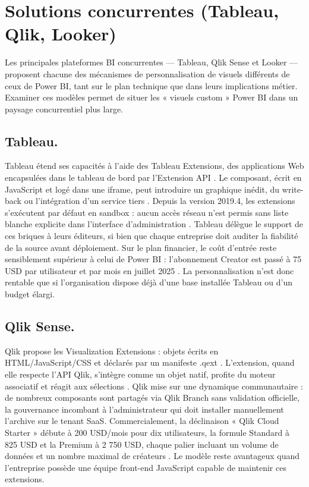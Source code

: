 \section{Solutions concurrentes (Tableau, Qlik, Looker)}
\label{sec:concurrence}

Les principales plateformes BI concurrentes — Tableau, Qlik Sense et
Looker — proposent chacune des mécanismes de personnalisation de visuels
différents de ceux de Power BI, tant sur le plan technique que dans leurs
implications métier. Examiner ces modèles permet de situer les « visuels
custom » Power BI dans un paysage concurrentiel plus large.

\subsection{Tableau.}  
Tableau étend ses capacités à l’aide des Tableau Extensions, des
applications Web encapsulées dans le tableau de bord par l’Extension API
\parencite{TableauExtGuide2024}. Le composant, écrit en JavaScript et
logé dans une iframe, peut introduire un graphique inédit, du
write-back ou l’intégration d’un service tiers
\parencite{TableauBlogExt2024}. Depuis la version 2019.4, les extensions
s’exécutent par défaut en sandbox : aucun accès réseau n’est permis
sans liste blanche explicite dans l’interface d’administration
\parencite{TableauAdmin2025}. Tableau délègue le support de ces briques à
leurs éditeurs, si bien que chaque entreprise doit auditer la fiabilité de
la source avant déploiement. Sur le plan financier, le coût d’entrée reste
sensiblement supérieur à celui de Power BI : l’abonnement Creator est passé
à 75 USD par utilisateur et par mois en juillet 2025
\parencite{TableauPricing2025}. La personnalisation n’est donc rentable que
si l’organisation dispose déjà d’une base installée Tableau ou d’un budget
élargi.

\subsection{Qlik Sense.}  
Qlik propose les Visualization Extensions : objets écrits
en HTML/JavaScript/CSS et déclarés par un manifeste .qext
\parencite{QlikDevHub2024}. L’extension, quand elle respecte l’API Qlik,
s’intègre comme un objet natif, profite du moteur associatif et réagit aux
sélections \parencite{QlikExtAPI2024}. Qlik mise sur une dynamique
communautaire : de nombreux composants sont partagés via Qlik Branch
sans validation officielle, la gouvernance incombant à l’administrateur
qui doit installer manuellement l’archive sur le tenant SaaS.
Commercialement, la déclinaison « Qlik Cloud Starter » débute à
200 USD/mois pour dix utilisateurs, la formule Standard à 825 USD et la
Premium à 2 750 USD, chaque palier incluant un volume de données et un
nombre maximal de créateurs \parencite{QlikPricing2025}. Le modèle reste
avantageux quand l’entreprise possède une équipe front-end JavaScript
capable de maintenir ces extensions.


